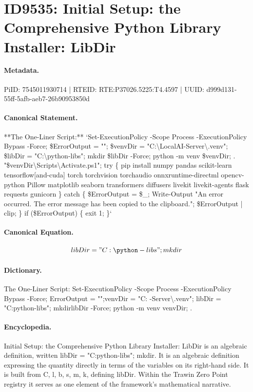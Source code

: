 \section*{ID9535: Initial Setup: the Comprehensive Python Library Installer: LibDir}
\paragraph{Metadata.}
PiID: 7545011930714 | RTEID: RTE:P37026.5225:T4.4597 | UUID: d999d131-55ff-5afb-aeb7-26b90953850d

\paragraph{Canonical Statement.}
**The One-Liner Script:** `Set-ExecutionPolicy -Scope Process -ExecutionPolicy Bypass -Force; \$ErrorOutput = ""; \$venvDir = "C:\textbackslash{}LocalAI-Server\textbackslash{}.venv"; \$libDir = "C:\textbackslash{}python-libs"; mkdir \$libDir -Force; python -m venv \$venvDir; . "\$venvDir\textbackslash{}Scripts\textbackslash{}Activate.ps1"; try \{ pip install numpy pandas scikit-learn tensorflow[and-cuda] torch torchvision torchaudio onnxruntime-directml opencv-python Pillow matplotlib seaborn transformers diffusers livekit livekit-agents flask requests gunicorn \} catch \{ \$ErrorOutput = \$\_; Write-Output "An error occurred. The error message has been copied to the clipboard."; \$ErrorOutput | clip; \} if (\$ErrorOutput) \{ exit 1; \}`

\paragraph{Canonical Equation.}
\[
libDir = "C:\python-libs"; mkdir
\]

\paragraph{Dictionary.}
The One-Liner Script: Set-ExecutionPolicy -Scope Process -ExecutionPolicy Bypass -Force; ErrorOutput = "";venvDir = "C: -Server\textbackslash{}.venv"; libDir = "C:python-libs"; mkdirlibDir -Force; python -m venv venvDir; .

\paragraph{Encyclopedia.}
Initial Setup: the Comprehensive Python Library Installer: LibDir is an algebraic definition, written libDir = "C:python-libs"; mkdir. It is an algebraic definition expressing the quantity directly in terms of the variables on its right-hand side. It is built from C, l, b, s, m, k, defining libDir. Within the Trawin Zero Point registry it serves as one element of the framework's mathematical narrative.

